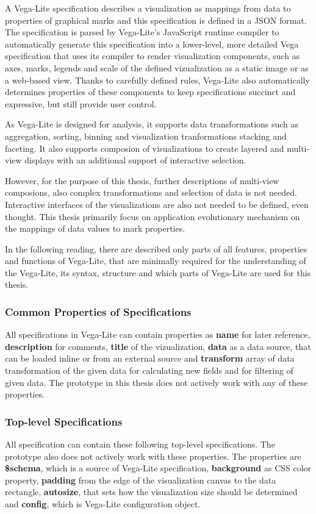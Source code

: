   A Vega-Lite specification describes a visualization as mappings from data to properties of graphical marks and this specification is defined in a JSON format\cite{vega}. The specification is parsed by Vega-Lite's JavaScript runtime compiler to automatically generate this specification into a lower-level, more detailed Vega \cite{vega-not-lite} specification that uses its compiler to render visualization components, such as axes, marks, legends and scale of the defined vizualization as a static image or as a web-based view. Thanks to carefully defined rules, Vega-Lite also automatically determines properties of these components to keep specifications succinct and expressive, but still provide user control.

  As Vega-Lite is designed for analysis, it supports data transformations such as aggregation, sorting, binning and visualization tranformations stacking and faceting. It also supports composion of visualizations to create layered and multi-view displays with an additional support of interactive selection.

  However, for the purpose of this thesis, further descriptions of multi-view composions, also complex transformations and selection of data is not needed. Interactive interfaces of the visualizations are also not needed to be defined, even thought. This thesis primarily focus on application evolutionary mechanism on the mappings of data values to mark properties.

  In the following reading, there are described only parts of all features, properties and functions of Vega-Lite, that are minimally required for the understanding of the Vega-Lite, its syntax, structure and which parts of Vega-Lite are used for this thesis.

  \subsubsection{Common Properties of Specifications}
  All specifications in Vega-Lite can contain properties as \textbf{name} for later reference, \textbf{description} for comments, \textbf{title} of the vizualization, \textbf{data} as a data source, that can be loaded inline or from an external source and \textbf{transform} array of data transformation of the given data for calculating new fields and for filtering of given data. The prototype in this thesis does not actively work with any of these properties.

  \subsubsection{Top-level Specifications}
  All specification can contain these following top-level specifications. The prototype also does not actively work with these properties. The properties are \textbf{\$schema}, which is a source of Vega-Lite specification, \textbf{background} as CSS color property, \textbf{padding} from the edge of the visualization canvas to the data rectangle, \textbf{autosize}, that sets how the visualization size should be determined and \textbf{config}, which is Vega-Lite configuration object.

